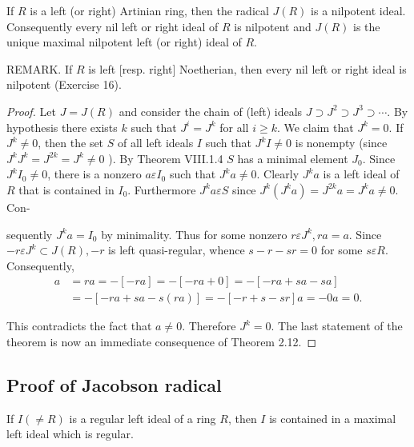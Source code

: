 \begin{proposition}
    If $R$ is a left (or right) Artinian ring, then the radical $J(R)$ is a nilpotent ideal. Consequently every nil left or right ideal of $R$ is nilpotent and $J(R)$ is the unique maximal nilpotent left (or right) ideal of $R$.

    REMARK. If $R$ is left [resp. right] Noetherian, then every nil left or right ideal is nilpotent (Exercise 16).

    \begin{proof}
        Let $J=J(R)$ and consider the chain of (left) ideals $J \supset J^2 \supset J^3 \supset \cdots$. By hypothesis there exists $k$ such that $J^i=J^k$ for all $i \geq k$. We claim that $J^k=0$. If $J^k \neq 0$, then the set $S$ of all left ideals $I$ such that $J^k I \neq 0$ is nonempty (since $J^k J^k=J^{2 k}=J^k \neq 0$ ). By Theorem VIII.1.4 $S$ has a minimal element $J_0$. Since $J^k I_0 \neq 0$, there is a nonzero $a \varepsilon I_0$ such that $J^k a \neq 0$. Clearly $J^k a$ is a left ideal of $R$ that is contained in $I_0$. Furthermore $J^k a \varepsilon S$ since $J^k\left(J^k a\right)=J^{2 k} a=J^k a \neq 0$. Con-

        sequently $J^k a=I_0$ by minimality. Thus for some nonzero $r \varepsilon J^k, r a=a$. Since $-r \varepsilon J^k \subset J(R),-r$ is left quasi-regular, whence $s-r-s r=0$ for some $s \varepsilon R$. Consequently,
        \begin{equation*}
            \begin{aligned}
                a & =r a=-[-r a]=-[-r a+0]=-[-r a+s a-s a]     \\
                  & =-[-r a+s a-s(r a)]=-[-r+s-s r] a=-0 a=0 .
            \end{aligned}
        \end{equation*}

        This contradicts the fact that $a \neq 0$. Therefore $J^k=0$. The last statement of the theorem is now an immediate consequence of Theorem 2.12.
    \end{proof}
\end{proposition}


\subsection{Proof of Jacobson radical}


\begin{lemma}
    \label{lem: If I is a regular left ideal of a ring R, then I is contained in a maximal left ideal which is regular.}
    If $I(\neq R)$ is a regular left ideal of a ring $R$, then $I$ is contained in a maximal left ideal which is regular.
\end{lemma}



